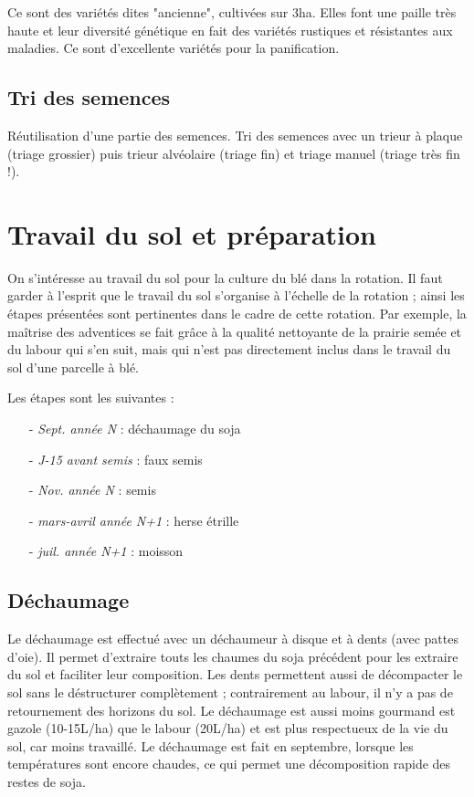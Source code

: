 \documentclass{article}
\begin{document}
Ce sont des variétés dites "ancienne", cultivées sur 3ha. Elles font une paille très haute et leur diversité génétique en fait des variétés rustiques et résistantes aux maladies. Ce sont d'excellente variétés pour la panification.

\subsection{Tri des semences}

Réutilisation d'une partie des semences. Tri des semences avec un trieur à plaque (triage grossier) puis trieur alvéolaire (triage fin) et triage manuel (triage très fin !). 

\section{Travail du sol et préparation}

On s'intéresse au travail du sol pour la culture du blé dans la rotation. Il faut garder à l'esprit que le travail du sol s'organise à l'échelle de la rotation ; ainsi les étapes présentées sont pertinentes dans le cadre de cette rotation. Par exemple, la maîtrise des adventices se fait grâce à la qualité nettoyante de la prairie semée et du labour qui s'en suit, mais qui n'est pas directement inclus dans le travail du sol d'une parcelle à blé.

Les étapes sont les suivantes :
\begin{itemize}
	\item[-] \textit{Sept. année N} : déchaumage du soja
	\item[-] \textit{J-15 avant semis} : faux semis
	\item[-] \textit{Nov. année N} : semis
	\item[-] \textit{mars-avril année N+1} : herse étrille
	\item[-] \textit{juil. année N+1} : moisson
\end{itemize}

\subsection{Déchaumage}

Le déchaumage est effectué avec un déchaumeur à disque et à dents (avec pattes d'oie). Il permet d'extraire touts les chaumes du soja précédent pour les extraire du sol et faciliter leur composition. Les dents permettent aussi de décompacter le sol sans le déstructurer complètement ; contrairement au labour, il n'y a pas de retournement des horizons du sol. Le déchaumage est aussi moins gourmand est gazole (10-15L/ha) que le labour (20L/ha) et est plus respectueux de la vie du sol, car moins travaillé. Le déchaumage est fait en septembre, lorsque les températures sont encore chaudes, ce qui permet une décomposition rapide des restes de soja.
\end{document}
